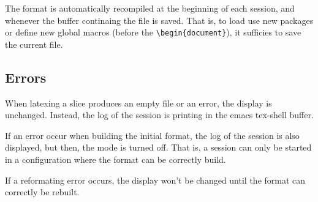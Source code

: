 \documentclass{article}
\let \lst \verb
\begin{document}
The format is automatically recompiled at the beginning of each session, and
whenever the buffer continaing the file is saved. That is, to load use new
packages or define new global macros (before the \lst"\begin{document}"), it
sufficies to save the current file.

\subsection {Errors}%

When latexing a slice produces an empty file or an error, the display is
unchanged. Instead, the log of the session is printing in the emacs
tex-shell buffer. 

If an error occur when building the initial format, the log of the session
is also displayed, but then, the mode is turned off. That is, a session can
only be started in a configuration where the format can be correctly build. 

If a reformating error occurs, the display won't be changed until the format
can correctly be rebuilt.
\end{document}
